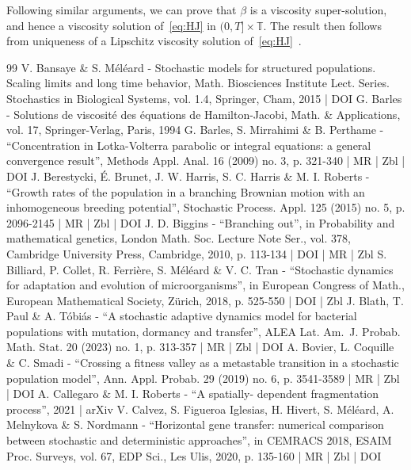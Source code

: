 \documentclass[10pt]{amsart}
\theoremstyle{plain}
\theoremstyle{remark}
\newcommand\T{\mathbb{T}}
\begin{document}
Following similar arguments, we can prove that $\beta$ is a viscosity super-solution, and hence a viscosity solution of~\eqref{eq:HJ} in $(0,T]\times \T$. The result then follows from uniqueness of a Lipschitz viscosity solution of~\eqref{eq:HJ}~\cite{GB:94}.



\begin{thebibliography}{99}
V. Bansaye \& S. Méléard - Stochastic models for structured populations. Scaling limits and long time behavior, Math. Biosciences Institute Lect. Series. Stochastics in Biological Systems, vol. 1.4, Springer, Cham, 2015 | DOI
G. Barles - Solutions de viscosité des équations de Hamilton-Jacobi, Math. \& Applications, vol. 17, Springer-Verlag, Paris, 1994
G. Barles, S. Mirrahimi \& B. Perthame - “Concentration in Lotka-Volterra parabolic or integral equations: a general convergence result”, Methods Appl. Anal. 16 (2009) no. 3, p. 321-340 | MR | Zbl | DOI
J. Berestycki, É. Brunet, J. W. Harris, S. C. Harris \& M. I. Roberts - “Growth rates of the population in a branching Brownian motion with an inhomogeneous breeding potential”, Stochastic Process. Appl. 125 (2015) no. 5, p. 2096-2145 | MR | Zbl | DOI
J. D. Biggins - “Branching out”, in Probability and mathematical genetics, London Math. Soc. Lecture Note Ser., vol. 378, Cambridge University Press, Cambridge, 2010, p. 113-134 | DOI | MR | Zbl
S. Billiard, P. Collet, R. Ferrière, S. Méléard \& V. C. Tran - “Stochastic dynamics for adaptation and evolution of microorganisms”, in European Congress of Math., European Mathematical Society, Zürich, 2018, p. 525-550 | DOI | Zbl
J. Blath, T. Paul \& A. Tóbiás - “A stochastic adaptive dynamics model for bacterial populations with mutation, dormancy and transfer”, ALEA Lat. Am. J. Probab. Math. Stat. 20 (2023) no. 1, p. 313-357 | MR | Zbl | DOI
A. Bovier, L. Coquille \& C. Smadi - “Crossing a fitness valley as a metastable transition in a stochastic population model”, Ann. Appl. Probab. 29 (2019) no. 6, p. 3541-3589 | MR | Zbl | DOI
A. Callegaro \& M. I. Roberts - “A spatially- dependent fragmentation process”, 2021 | arXiv
V. Calvez, S. Figueroa Iglesias, H. Hivert, S. Méléard, A. Melnykova \& S. Nordmann - “Horizontal gene transfer: numerical comparison between stochastic and deterministic approaches”, in CEMRACS 2018, ESAIM Proc. Surveys, vol. 67, EDP Sci., Les Ulis, 2020, p. 135-160 | MR | Zbl | DOI

\end{thebibliography}
\end{document}
